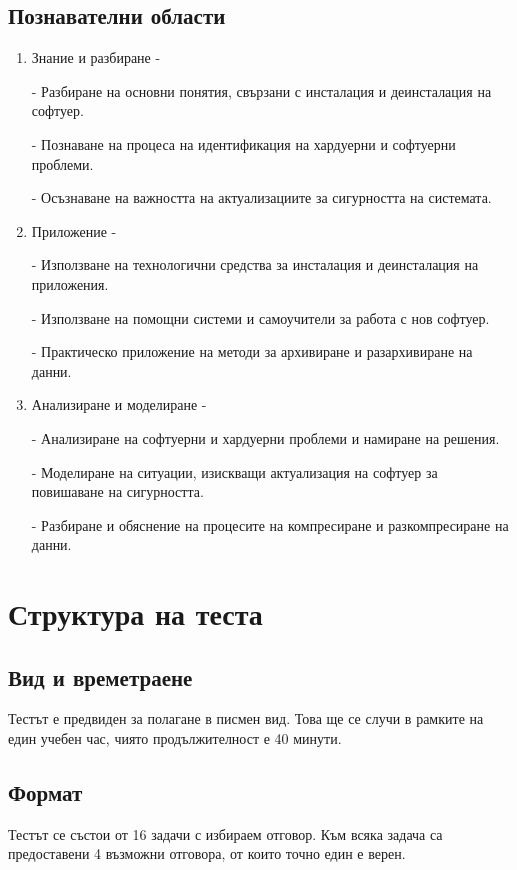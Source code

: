 \subsection{Познавателни области}
\begin{enumerate}
    \item Знание и разбиране -
    
    - Разбиране на основни понятия, свързани с инсталация и деинсталация на софтуер.
    
    - Познаване на процеса на идентификация на хардуерни и софтуерни проблеми.

    - Осъзнаване на важността на актуализациите за сигурността на системата.

    \item Приложение -

    - Използване на технологични средства за инсталация и деинсталация на приложения.
    
    - Използване на помощни системи и самоучители за работа с нов софтуер.
    
    - Практическо приложение на методи за архивиране и разархивиране на данни.
    
    \item Анализиране и моделиране -
    
    - Анализиране на софтуерни и хардуерни проблеми и намиране на решения.
    
    - Моделиране на ситуации, изискващи актуализация на софтуер за повишаване на сигурността.

    - Разбиране и обяснение на процесите на компресиране и разкомпресиране на данни.
\end{enumerate}

\section{Структура на теста}

\subsection{Вид и времетраене}

Тестът е предвиден за полагане в писмен вид. Това ще се случи в рамките на един учебен час, чиято продължителност е 40 минути.

\subsection{Формат}
Тестът се състои от 16 задачи с избираем отговор. Към всяка задача са предоставени 4 възможни отговора, от които точно един е верен. 

